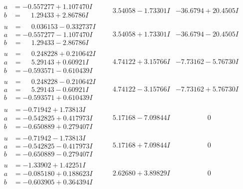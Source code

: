 \documentclass[1p]{elsarticle_modified}
\theoremstyle{definition}
\begin{document}
$$\begin{array}{c|c|c}
\begin{aligned}
a &= -0.557277 + 1.107470 I \\
b &= \phantom{-}1.29433 + 2.86786 I\end{aligned}
 & \phantom{-}3.54058 - 1.73301 I & -36.6794 + 20.4505 I \\ \hline\begin{aligned}
u &= \phantom{-}0.036153 - 0.332737 I \\
a &= -0.557277 - 1.107470 I \\
b &= \phantom{-}1.29433 - 2.86786 I\end{aligned}
 & \phantom{-}3.54058 + 1.73301 I & -36.6794 - 20.4505 I \\ \hline\begin{aligned}
u &= \phantom{-}0.248228 + 0.210642 I \\
a &= \phantom{-}5.29143 + 0.60921 I \\
b &= -0.593571 - 0.610439 I\end{aligned}
 & \phantom{-}4.74122 + 3.15766 I & -7.73162 - 5.76730 I \\ \hline\begin{aligned}
u &= \phantom{-}0.248228 - 0.210642 I \\
a &= \phantom{-}5.29143 - 0.60921 I \\
b &= -0.593571 + 0.610439 I\end{aligned}
 & \phantom{-}4.74122 - 3.15766 I & -7.73162 + 5.76730 I \\ \hline\begin{aligned}
u &= -0.71942 + 1.73813 I \\
a &= -0.542825 + 0.417973 I \\
b &= -0.650889 + 0.279407 I\end{aligned}
 & \phantom{-}5.17168 - 7.09844 I & \phantom{-0.000000 } 0 \\ \hline\begin{aligned}
u &= -0.71942 - 1.73813 I \\
a &= -0.542825 - 0.417973 I \\
b &= -0.650889 - 0.279407 I\end{aligned}
 & \phantom{-}5.17168 + 7.09844 I & \phantom{-0.000000 } 0 \\ \hline\begin{aligned}
u &= -1.33902 + 1.42251 I \\
a &= -0.085180 + 0.188623 I \\
b &= -0.603905 + 0.364394 I\end{aligned}
 & \phantom{-}2.62680 + 3.89829 I & \phantom{-0.000000 } 0\\

\end{array}$$
\end{document}
